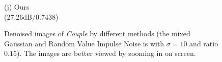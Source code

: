 \documentclass[runningheads]{llncs}
\begin{document}
\begin{figure}
{\begin{minipage}[t]{0.2\textwidth}
{\footnotesize (j) Ours \\(27.26dB/0.7438)}
\end{minipage}
}
\caption{Denoised images of \textsl{Couple} by different methods (the mixed Gaussian and Random Value Impulse Noise is with $\sigma = 10$ and ratio $0.15$). The images are better viewed by zooming in on screen.}
\label{fig7}
\end{figure}

\begin{figure}
\centering
{}
\end{figure}
\end{document}
